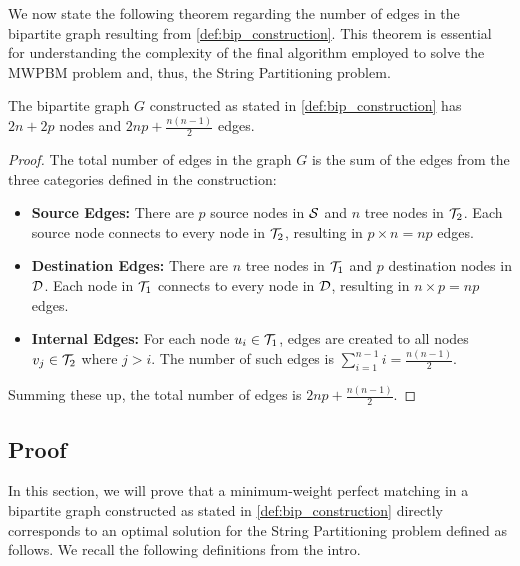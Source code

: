 We now state the following theorem regarding the number of edges in the bipartite graph resulting from \cref{def:bip_construction}. This theorem is essential for understanding the complexity of the final algorithm employed to solve the MWPBM problem and, thus, the String Partitioning problem.

\begin{lemma} \label{thm:bip_graph_properties}
    The bipartite graph $G$ constructed as stated in \cref{def:bip_construction} has $2n + 2p$ nodes and $2np + \frac{n(n-1)}{2}$ edges.
\end{lemma}

\begin{proof}
    The total number of edges in the graph $G$ is the sum of the edges from the three categories defined in the construction:
    \begin{itemize}[leftmargin=25pt]
        \item \textbf{Source Edges:} There are $p$ source nodes in $\mathcal{S}$ and $n$ tree nodes in $\mathcal{T}_{2}$. Each source node connects to every node in $\mathcal{T}_{2}$, resulting in $p \times n = np$ edges.

        \item \textbf{Destination Edges:} There are $n$ tree nodes in $\mathcal{T}_{1}$ and $p$ destination nodes in $\mathcal{D}$. Each node in $\mathcal{T}_{1}$ connects to every node in $\mathcal{D}$, resulting in $n \times p = np$ edges.

        \item \textbf{Internal Edges:} For each node $u_i \in \mathcal{T}_{1}$, edges are created to all nodes $v_j \in \mathcal{T}_{2}$ where $j > i$. The number of such edges is $\sum_{i=1}^{n-1} i = \frac{n(n-1)}{2}$.
    \end{itemize}

    Summing these up, the total number of edges is $2np + \frac{n(n-1)}{2}$.
\end{proof}

\subsection{Proof}
In this section, we will prove that a minimum-weight perfect matching in a bipartite graph constructed as stated in \cref{def:bip_construction} directly corresponds to an optimal solution for the String Partitioning problem defined as follows. We recall the following definitions from the intro.

\rundef*

